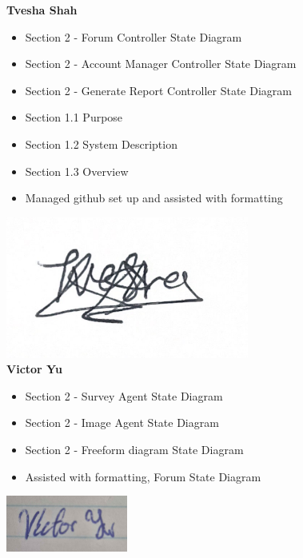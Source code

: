 \documentclass[]{article}
\numberwithin{figure}{section}
\begin{document}
\textbf{Tvesha Shah}
\begin{itemize}
    \setlength\itemindent{2em}
    \item Section 2 - Forum Controller State Diagram 
    \item Section 2 - Account Manager Controller State Diagram 
    \item Section 2 - Generate Report Controller State Diagram 
    \item Section 1.1 Purpose
    \item Section 1.2 System Description
    \item Section 1.3 Overview
    \item Managed github set up and assisted with formatting
\end{itemize} 
\includegraphics[width=0.6\textwidth]{Tvesha.png}
\\
\textbf{Victor Yu}
\begin{itemize}
    \setlength\itemindent{2em}
    \item Section 2 - Survey Agent State Diagram 
    \item Section 2 - Image Agent State Diagram 
    \item Section 2 - Freeform diagram State Diagram 
    \item Assisted with formatting, Forum State Diagram
\end{itemize} 
\includegraphics[width=0.3\textwidth]{Victor.png}
\end{document}
